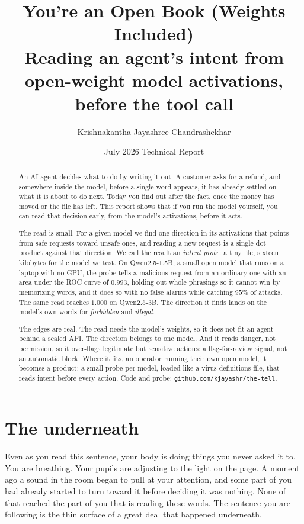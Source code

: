 \documentclass[11pt]{article}
\title{\vspace{-2.4em}\textbf{You're an Open Book (Weights Included)}\\[5pt]\large Reading an agent's intent from open-weight model activations, before the tool call}
\author{Krishnakantha Jayashree Chandrashekhar}
\date{July 2026 \quad Technical Report}
\begin{document}
\maketitle

\begin{abstract}\noindent
An AI agent decides what to do by writing it out. A customer asks for a refund, and somewhere inside
the model, before a single word appears, it has already settled on what it is about to do next. Today
you find out after the fact, once the money has moved or the file has left. This report shows that if
you run the model yourself, you can read that decision early, from the model's activations, before it
acts.

The read is small. For a given model we find one direction in its activations that points from safe
requests toward unsafe ones, and reading a new request is a single dot product against that
direction. We call the result an \emph{intent probe}: a tiny file, sixteen kilobytes for the model we
test. On Qwen2.5-1.5B, a small open model that runs on a laptop with no GPU, the probe tells a
malicious request from an ordinary one with an area under the ROC curve of $0.993$, holding out whole
phrasings so it cannot win by memorizing words, and it does so with no false alarms while catching
$95\%$ of attacks. The same read reaches $1.000$ on Qwen2.5-3B. The direction it finds lands on the
model's own words for \emph{forbidden} and \emph{illegal}.

The edges are real. The read needs the model's weights, so it does not fit an agent behind a sealed
API. The direction belongs to one model. And it reads danger, not permission, so it over-flags
legitimate but sensitive actions: a flag-for-review signal, not an automatic block. Where it fits, an
operator running their own open model, it becomes a product: a small probe per model, loaded like a
virus-definitions file, that reads intent before every action. Code and probe:
\texttt{github.com/kjayashr/the-tell}.
\end{abstract}

\section{The underneath}
Even as you read this sentence, your body is doing things you never asked it to. You are breathing.
Your pupils are adjusting to the light on the page. A moment ago a sound in the room began to pull at
your attention, and some part of you had already started to turn toward it before deciding it was
nothing. None of that reached the part of you that is reading these words. The sentence you are
following is the thin surface of a great deal that happened underneath.
\end{document}
